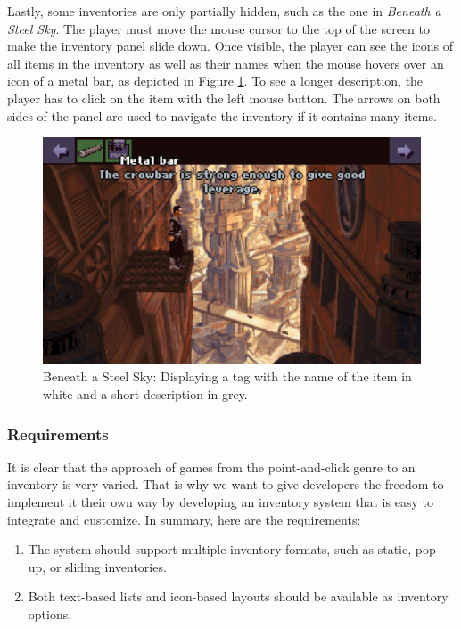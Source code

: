 Lastly, some inventories are only partially hidden, such as the one in \textit{Beneath a Steel Sky}. The player must move the mouse cursor to the top of the screen to make the inventory panel slide down. Once visible, the player can see the icons of all items in the inventory as well as their names when the mouse hovers over an icon of a metal bar, as depicted in Figure \ref{fig:I-BaSS2}. To see a longer description, the player has to click on the item with the left mouse button. The arrows on both sides of the panel are used to navigate the inventory if it contains many items.

\begin{figure}[H]
\centering
\includegraphics[width=.8\linewidth]{img/I-BaSS2.png}
\caption{Beneath a Steel Sky: Displaying a tag with the name of the item in white and a short description in grey.}
\label{fig:I-BaSS2}
\end{figure}

\subsubsection{Requirements}
It is clear that the approach of games from the point-and-click genre to an inventory is very varied. That is why we want to give developers the freedom to implement it their own way by developing an inventory system that is easy to integrate and customize. In summary, here are the requirements:

\begin{enumerate}[label=\color{teal}\textbf{R{\arabic*}},resume]
  \item \label{intro:req:inv_formats} The system should support multiple inventory formats, such as static, pop-up, or sliding inventories.
  \item \label{intro:req:text_icon} Both text-based lists and icon-based layouts should be available as inventory options.
\end{enumerate}

